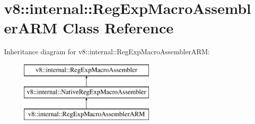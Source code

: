 \hypertarget{classv8_1_1internal_1_1_reg_exp_macro_assembler_a_r_m}{}\section{v8\+:\+:internal\+:\+:Reg\+Exp\+Macro\+Assembler\+A\+RM Class Reference}
\label{classv8_1_1internal_1_1_reg_exp_macro_assembler_a_r_m}
Inheritance diagram for v8\+:\+:internal\+:\+:Reg\+Exp\+Macro\+Assembler\+A\+RM\+:\begin{figure}[H]
\begin{center}
\leavevmode
\includegraphics[height=3.000000cm]{classv8_1_1internal_1_1_reg_exp_macro_assembler_a_r_m}
\end{center}
\end{figure}
